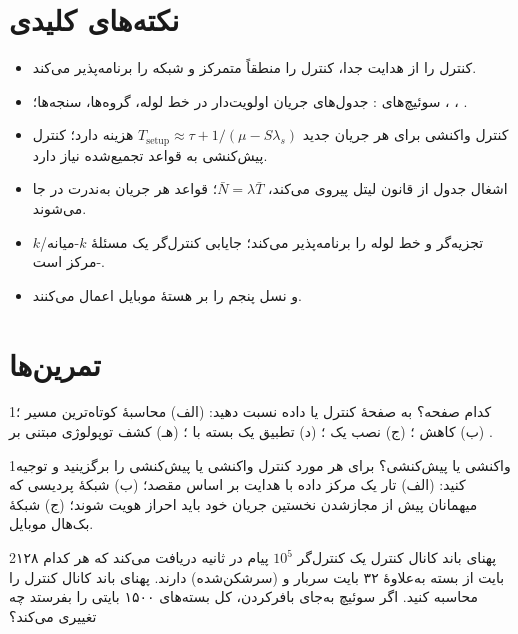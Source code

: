 \documentclass[11pt,a4paper]{article}
\begin{document}
\section{نکته‌های کلیدی}
\begin{takeawaybox}
\begin{itemize}
  \item {} کنترل را از هدایت جدا، کنترل را منطقاً متمرکز و شبکه را برنامه‌پذیر می‌کند.
  \item سوئیچ‌های : جدول‌های جریان اولویت‌دار در خط لوله، گروه‌ها، سنجه‌ها؛ ، ،
        .
  \item کنترل واکنشی برای هر جریان جدید $T_{\mathrm{setup}} \approx \tau + 1/(\mu - S\lambda_s)$ هزینه دارد؛ کنترل پیش‌کنشی
        به قواعد تجمیع‌شده نیاز دارد.
  \item اشغال جدول از قانون لیتل پیروی می‌کند، $\bar N = \lambda\bar T$؛ قواعد هر جریان به‌ندرت در  جا می‌شوند.
  \item {} تجزیه‌گر و خط لوله را برنامه‌پذیر می‌کند؛ جایابی کنترل‌گر یک مسئلهٔ $k$-میانه/$k$-مرکز است.
  \item {} و  نسل پنجم  را بر هستهٔ موبایل اعمال می‌کنند.
\end{itemize}
\end{takeawaybox}

\section{تمرین‌ها}

\begin{exercisebox}{1}{کدام صفحه؟}\label{exr:planes}
به صفحهٔ کنترل یا داده نسبت دهید: (الف) محاسبهٔ کوتاه‌ترین مسیر ؛ (ب) کاهش ؛ (ج) نصب یک ؛
(د) تطبیق یک بسته با ؛ (هـ) کشف توپولوژی مبتنی بر .
\end{exercisebox}

\begin{exercisebox}{1}{واکنشی یا پیش‌کنشی؟}\label{exr:proactive}
برای هر مورد کنترل واکنشی یا پیش‌کنشی را برگزینید و توجیه کنید: (الف) تار یک مرکز داده با هدایت بر اساس مقصد؛ (ب) شبکهٔ
پردیسی که میهمانان پیش از مجازشدن نخستین جریان خود باید احراز هویت شوند؛ (ج) شبکهٔ بک‌هال موبایل.
\end{exercisebox}

\begin{exercisebox}{2}{پهنای باند کانال کنترل}\label{exr:packetin}
یک کنترل‌گر $10^5$ پیام  در ثانیه دریافت می‌کند که هر کدام ۱۲۸ بایت از بسته به‌علاوهٔ ۳۲ بایت سربار
 و  (سرشکن‌شده) دارند. پهنای باند کانال کنترل را محاسبه کنید. اگر سوئیچ به‌جای بافرکردن، کل
بسته‌های ۱۵۰۰ بایتی را بفرستد چه تغییری می‌کند؟
\end{exercisebox}
\end{document}

